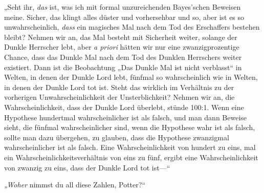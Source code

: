 „Seht ihr, \emph{das} ist, was ich mit formal unzureichenden Bayes'schen Beweisen meine. Sicher, das klingt alles düster und vorhersehbar und so, aber ist es so unwahrscheinlich, \emph{dass} ein magisches Mal nach dem Tod des Erschaffers bestehen bleibt? Nehmen wir an, das Mal besteht mit Sicherheit weiter, solange der Dunkle Herrscher lebt, aber \emph{a priori} hätten wir nur eine zwanzigprozentige Chance, dass das Dunkle Mal nach dem Tod des Dunklen Herrschers weiter existiert. Dann ist die Beobachtung „Das Dunkle Mal ist nicht verblasst“ in Welten, in denen der Dunkle Lord lebt, fünfmal so wahrscheinlich wie in Welten, in denen der Dunkle Lord tot ist. Steht das wirklich im Verhältnis zu der vorherigen Unwahrscheinlichkeit der Unsterblichkeit? Nehmen wir an, die Wahrscheinlichkeit, dass der Dunkle Lord überlebt, stünde 100:1. Wenn eine Hypothese hundertmal wahrscheinlicher ist als falsch, und man dann Beweise sieht, die fünfmal wahrscheinlicher sind, wenn die Hypothese wahr ist als falsch, sollte man dazu übergehen, zu glauben, dass die Hypothese zwanzigmal wahrscheinlicher ist als falsch. Eine Wahrscheinlichkeit von hundert zu eins, mal ein Wahrscheinlichkeitsverhältnis von eins zu fünf, ergibt eine Wahrscheinlichkeit von zwanzig zu eins, dass der Dunkle Lord tot ist—“

\emph{„Woher} nimmst du all diese Zahlen, Potter?“

